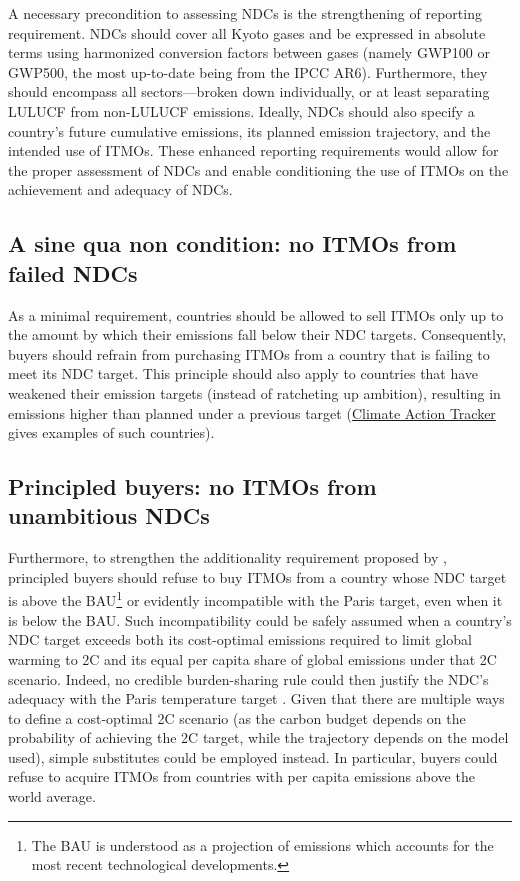 ﻿\documentclass[12pt,english]{article}
\begin{document}
A necessary precondition to assessing NDCs is the strengthening of reporting requirement. NDCs should cover all Kyoto gases and be expressed in absolute terms using harmonized conversion factors between gases (namely GWP100 or GWP500, the most up-to-date being from the IPCC AR6). Furthermore, they should encompass all sectors---broken down individually, or at least separating LULUCF from non-LULUCF emissions. Ideally, NDCs should also specify a country's future cumulative emissions, its planned emission trajectory, and the intended use of ITMOs. These enhanced reporting requirements would allow for the proper assessment of NDCs and enable conditioning the use of ITMOs on the achievement and adequacy of NDCs. 

\subsection{A sine qua non condition: no ITMOs from failed NDCs} %
As a minimal requirement, countries should be allowed to sell ITMOs only up to the amount by which their emissions fall below their NDC targets. Consequently, buyers should refrain from purchasing ITMOs from a country that is failing to meet its NDC target. %
This principle should also apply to countries that have weakened their emission targets (instead of ratcheting up ambition), resulting in emissions higher than planned under a previous target (\href{https://climateactiontracker.org/climate-target-update-tracker/list-non-updating-countries/}{Climate Action Tracker} gives examples of such countries).

\subsection{Principled buyers: no ITMOs from unambitious NDCs} %
Furthermore, to strengthen the additionality requirement proposed by \cite{michaelowa_additionality_2019}, %
principled buyers should refuse to buy ITMOs from a country whose NDC target is above the BAU\footnote{The BAU is understood as a projection of emissions which accounts for the most recent technological developments.} 
or evidently incompatible with the Paris target, even when it is below the BAU.
Such incompatibility could be safely assumed when a country's NDC target exceeds both its cost-optimal emissions required to limit global warming to 2\textdegree{}C and its equal per capita share of global emissions under that 2\textdegree{}C scenario. %
Indeed, no credible burden-sharing rule could then justify the NDC's adequacy with the Paris temperature target %
 \citep{van_den_berg_implications_2020,robiou_du_pont_equitable_2017,hohne_regional_2014}. %
Given that there are multiple ways to define a cost-optimal 2\textdegree{}C scenario (as the carbon budget depends on the probability of achieving the 2\textdegree{}C target, while the trajectory depends on the model used), simple substitutes could be employed instead. In particular, buyers could refuse to acquire ITMOs from countries with per capita emissions %
above the world average. %
\end{document}
